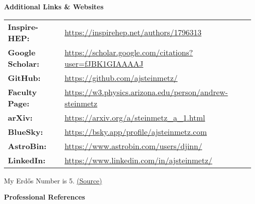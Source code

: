 \documentclass[11pt]{article}
\begin{document}
\medskip

{\Large\textbf{Additional Links \& Websites}}

\begin{tabular}{@{}ll@{}}
    \textbf{Inspire-HEP:} & \href{https://inspirehep.net/authors/1796313}{https://inspirehep.net/authors/1796313} \\
    \textbf{Google Scholar:} & \href{https://scholar.google.com/citations?user=fJBK1GIAAAAJ}{https://scholar.google.com/citations?user=fJBK1GIAAAAJ} \\
    \textbf{GitHub:} & \href{https://github.com/ajsteinmetz/}{https://github.com/ajsteinmetz/} \\
    \textbf{Faculty Page:} & \href{https://w3.physics.arizona.edu/person/andrew-steinmetz}{https://w3.physics.arizona.edu/person/andrew-steinmetz} \\
    \textbf{arXiv:} & \href{https://arxiv.org/a/steinmetz\_a\_1.html}{https://arxiv.org/a/steinmetz\_a\_1.html} \\
    \textbf{BlueSky:} & \href{https://bsky.app/profile/ajsteinmetz.com}{https://bsky.app/profile/ajsteinmetz.com} \\
    \textbf{AstroBin:} & \href{https://www.astrobin.com/users/djinn/}{https://www.astrobin.com/users/djinn/} \\
    \textbf{LinkedIn:} & \href{https://www.linkedin.com/in/ajsteinmetz/}{https://www.linkedin.com/in/ajsteinmetz/} \\
\end{tabular}

My Erd\H{o}s Number is 5. \href{https://mathscinet.ams.org/mathscinet/freetools/collab-dist?source=1443426\&target=189017}{(Source)}

\medskip

{\Large\textbf{Professional References}}
\end{document}
